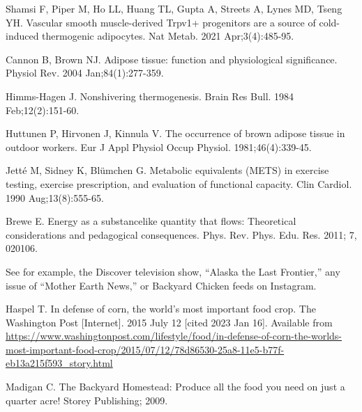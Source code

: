\documentclass[12pt]{iopart}
\begin{document}
\begin{thebibliography}{99}
Shamsi F, Piper M, Ho LL, Huang TL, Gupta A, Streets A, Lynes MD, Tseng YH. 
Vascular smooth muscle-derived Trpv1+ progenitors are a source of cold-induced thermogenic adipocytes. 
Nat Metab. 
2021 Apr;3(4):485-95.

Cannon B, Brown NJ. 
Adipose tissue: function and physiological significance.
Physiol Rev. 
2004 Jan;84(1):277-359. 

Himms-Hagen J. 
Nonshivering thermogenesis. 
Brain Res Bull. 
1984 Feb;12(2):151-60. 

Huttunen P, Hirvonen J, Kinnula V. 
The occurrence of brown adipose tissue in outdoor workers. 
Eur J Appl Physiol Occup Physiol. 
1981;46(4):339-45. 

Jetté M, Sidney K, Blümchen G. 
Metabolic equivalents (METS) in exercise testing, exercise prescription, and evaluation of functional capacity. 
Clin Cardiol. 
1990 Aug;13(8):555-65. 

Brewe E.
Energy as a substancelike quantity that flows: Theoretical considerations
and pedagogical consequences.
Phys. Rev. Phys. Edu. Res.
2011; 7, 020106.

See for example, the Discover television show, ``Alaska the Last Frontier,'' any issue of ``Mother Earth News,'' or Backyard Chicken feeds on Instagram.  
 
 
Haspel T.
In defense of corn, the world’s most important food crop.
The Washington Post [Internet].
2015 July 12 [cited 2023 Jan 16].
Available from \url{https://www.washingtonpost.com/lifestyle/food/in-defense-of-corn-the-worlds-most-important-food-crop/2015/07/12/78d86530-25a8-11e5-b77f-eb13a215f593_story.html}

Madigan C. 
The Backyard Homestead: Produce all the food you need on just a quarter acre!
Storey Publishing; 2009.




\end{thebibliography}
\end{document}
